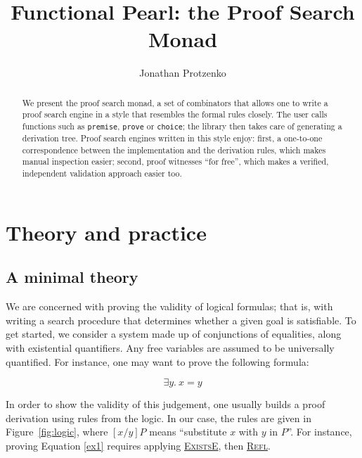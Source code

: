 \documentclass{easychair}
\def\li{\lstinline}
\let\TirName\textsc
\renewcommand{\DefTirName}[1]{\hyperlink{#1}{\TirName {#1}}}
\let\Rule\DefTirName
\newcommand{\fref}[1]{Figure~\ref{fig:#1}}
\begin{document}
\title{Functional Pearl: the Proof Search Monad}

\author{Jonathan Protzenko}

\maketitle

\begin{abstract}
  We present the proof search monad, a set of combinators that allows one to
  write a proof search engine in a style that resembles the formal rules
  closely. The user calls functions such as \li+premise+, \li+prove+ or
  \li+choice+; the library then takes care of generating a derivation tree.
  Proof search engines written in this style enjoy: first, a one-to-one
  correspondence between the implementation and the derivation rules, which
  makes manual inspection easier; second, proof witnesses ``for free'', which
  makes a verified, independent validation approach easier too.
\end{abstract}

\section{Theory and practice}
\label{sec:intro}

\subsection{A minimal theory}

We are concerned with proving the validity of logical formulas; that is, with
writing a search procedure that determines whether a given goal is satisfiable.
To get started, we consider a system made up of conjunctions of equalities,
along with existential quantifiers. Any free variables are assumed to be
universally quantified. For instance, one may want to prove the following
formula:

\begin{equation}
  \exists y.\ x = y
  \label{ex1}
\end{equation}

In order to show the validity of this judgement, one usually builds a proof
derivation using rules from the logic. In our case, the rules are given in
\fref{logic}, where $[x/y]P$ means ``substitute $x$ with $y$ in $P$''. For
instance, proving Equation \ref{ex1} requires applying \Rule{ExistsE}, then
\Rule{Refl}.
\end{document}
